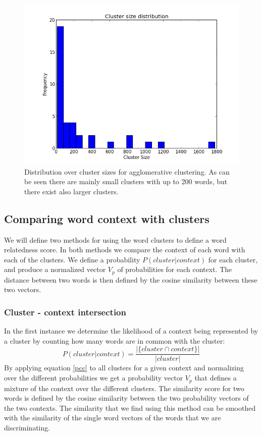 \documentclass[11pt]{article}
\begin{document}
\begin{figure}
\center
\includegraphics[scale=0.40]{images/cluster_size.png}
\caption{Distribution over cluster sizes for agglomerative clustering. As can be seen there are mainly small clusters with up to 200 words, but there exist also larger clusters.}
\label{cluster_size}
\end{figure}

\subsection{Comparing word context with clusters}
We will define two methods for using the word clusters to define a word relatedness score. In both methods we compare the context of each word with each of the clusters. We define a probability $P( cluster | context )$ for each cluster, and produce a normalized vector $V_p$ of probabilities for each context. The distance between two words is then defined by the cosine similarity between these two vectors.

\subsubsection{Cluster - context intersection}
In the first instance we determine the likelihood of a context being represented by a cluster by counting how many words are in common with the cluster:
\begin{equation} \label{pcc}P( \textit{cluster} | \textit{context}) = \frac{ | \{\textit{cluster} \cap \textit{context}\} |  }{| \textit{cluster} |} \end{equation}
By applying equation \ref{pcc} to all clusters for a given context and normalizing over the different probabilities we get a probability vector $V_{p}$ that defines a mixture of the context over the different clusters. The similarity score for two words is defined by the cosine similarity between the two probability vectors of the two contexts. The similarity that we find using this method can be smoothed with the similarity of the single word vectors of the words that we are discriminating.
\end{document}
